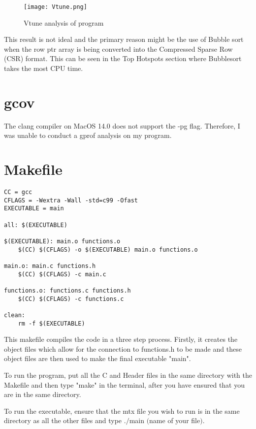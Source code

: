 \documentclass[12pt]{article}
\begin{document}
\begin{figure}[htbp]
    \centering
    \texttt{[image: Vtune.png]}
    \caption{Vtune analysis of program}
    \label{fig:enter-label}
\end{figure}

This result is not ideal and the primary reason might be the use of Bubble sort when the row ptr array is being converted into the Compressed Sparse Row (CSR) format. This can be seen in the Top Hotspots section where Bubblesort takes the most CPU time.  


\section{gcov}
The clang compiler on MacOS 14.0 does not support the -pg flag. Therefore, I was unable to conduct a gprof analysis on my program. 

\section{Makefile}
	\begin{lstlisting}
CC = gcc
CFLAGS = -Wextra -Wall -std=c99 -Ofast 
EXECUTABLE = main

all: $(EXECUTABLE)

$(EXECUTABLE): main.o functions.o
	$(CC) $(CFLAGS) -o $(EXECUTABLE) main.o functions.o 

main.o: main.c functions.h
	$(CC) $(CFLAGS) -c main.c 

functions.o: functions.c functions.h
	$(CC) $(CFLAGS) -c functions.c

clean:
	rm -f $(EXECUTABLE)

	\end{lstlisting}



 This makefile compiles the code in a three step process. Firstly, it creates the object files which allow for the connection to functions.h to be made and these object files are then used to make the final executable "main". 

 To run the program, put all the C and Header files in the same directory with the Makefile and then type "make" in the terminal, after you have ensured that you are in the same directory. 

 To run the executable, ensure that the mtx file you wish to run is in the same directory as all the other files and type $./$main $($name of your file$)$.
\end{document}
